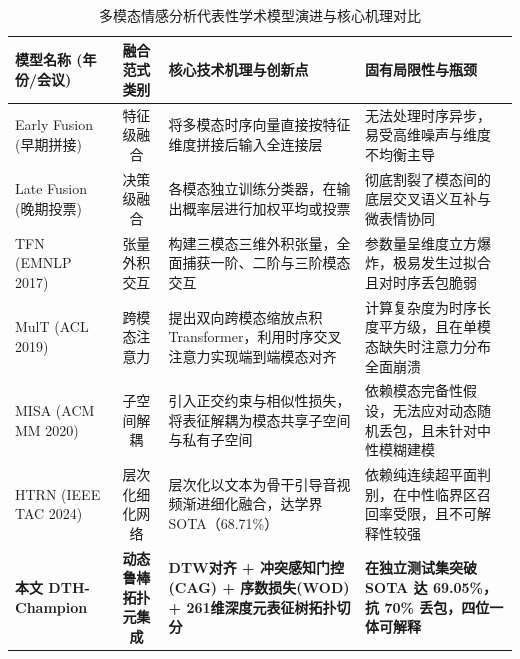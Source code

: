 \begin{table}[htp!]
\centering
\small
\renewcommand\arraystretch{1.3}
\caption{多模态情感分析代表性学术模型演进与核心机理对比}
\label{tab:literature}
\begin{tabularx}{\textwidth}{|l|c|X|X|}
\hline
\textbf{模型名称 (年份/会议)} & \textbf{融合范式类别} & \textbf{核心技术机理与创新点} & \textbf{固有局限性与瓶颈} \\ \hline
Early Fusion (早期拼接) & 特征级融合 & 将多模态时序向量直接按特征维度拼接后输入全连接层 & 无法处理时序异步，易受高维噪声与维度不均衡主导 \\ \hline
Late Fusion (晚期投票) & 决策级融合 & 各模态独立训练分类器，在输出概率层进行加权平均或投票 & 彻底割裂了模态间的底层交叉语义互补与微表情协同 \\ \hline
TFN (EMNLP 2017)\cite{zadeh2017tensor} & 张量外积交互 & 构建三模态三维外积张量，全面捕获一阶、二阶与三阶模态交互 & 参数量呈维度立方爆炸，极易发生过拟合且对时序丢包脆弱 \\ \hline
MulT (ACL 2019)\cite{tsai2019multimodal} & 跨模态注意力 & 提出双向跨模态缩放点积 Transformer，利用时序交叉注意力实现端到端模态对齐 & 计算复杂度为时序长度平方级，且在单模态缺失时注意力分布全面崩溃 \\ \hline
MISA (ACM MM 2020)\cite{hazarika2020misa} & 子空间解耦 & 引入正交约束与相似性损失，将表征解耦为模态共享子空间与私有子空间 & 依赖模态完备性假设，无法应对动态随机丢包，且未针对中性模糊建模 \\ \hline
HTRN (IEEE TAC 2024)\cite{htrn2024} & 层次化细化网络 & 层次化以文本为骨干引导音视频渐进细化融合，达学界 SOTA（68.71\%） & 依赖纯连续超平面判别，在中性临界区召回率受限，且不可解释性较强 \\ \hline
\textbf{本文 DTH-Champion} & \textbf{动态鲁棒拓扑元集成} & \textbf{DTW对齐 + 冲突感知门控(CAG) + 序数损失(WOD) + 261维深度元表征树拓扑切分} & \textbf{在独立测试集突破 SOTA 达 69.05\%，抗 70\% 丢包，四位一体可解释} \\ \hline
\end{tabularx}
\end{table}


